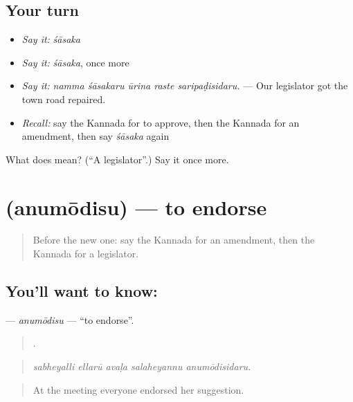 \subsection*{Your turn}
\begin{itemize}
\raggedright
  \item \emph{Say it:} \emph{śāsaka}
  \item \emph{Say it:} \emph{śāsaka}, once more
  \item \emph{Say it:} \emph{namma śāsakaru ūrina raste saripaḍisidaru.} — Our legislator got the town road repaired.
  \item \emph{Recall:} say the Kannada for to approve, then the Kannada for an amendment, then say \emph{śāsaka} again
\end{itemize}

\begin{tcolorbox}[breakable,colback=teal!4,colframe=teal!35!black,title={Before you move on}]
What does  mean? (\textquotedblleft{}A legislator\textquotedblright{}.) Say it once more.
\end{tcolorbox}
\section[\texorpdfstring{\kn{ಅನುಮೋದಿಸು} (anumōdisu)}{ಅನುಮೋದಿಸು (anumōdisu)}]{ (anumōdisu) — to endorse}

\label{lesson:KA-C396-anumodisu}



\begin{quote}
Before the new one: say the Kannada for an amendment, then the Kannada for a legislator.
\end{quote}

\subsection*{You'll want to know: }
\textbf{} — \emph{anumōdisu} — \textquotedblleft{}to endorse\textquotedblright{}.

\begin{quote}
    .
\end{quote}

\begin{quote}
\emph{sabheyalli ellarū avaḷa salaheyannu anumōdisidaru.}
\end{quote}

\begin{quote}
At the meeting everyone endorsed her suggestion.
\end{quote}

